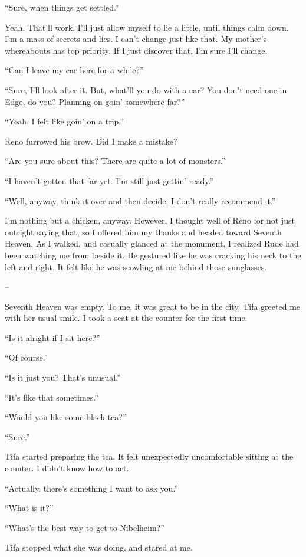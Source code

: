 \documentclass[oneside]{book}
\begin{document}
“Sure, when things get settled.”

Yeah. That’ll work. I’ll just allow myself to lie a little, until things calm down. I’m a mass of secrets and lies. I can’t change just like that. My mother’s whereabouts has top priority. If I just discover that, I’m sure I’ll change.

“Can I leave my car here for a while?”

“Sure, I’ll look after it. But, what’ll you do with a car? You don’t need one in Edge, do you? Planning on goin’ somewhere far?”

“Yeah. I felt like goin’ on a trip.”

Reno furrowed his brow. Did I make a mistake?

“Are you sure about this? There are quite a lot of monsters.”

“I haven’t gotten that far yet. I’m still just gettin’ ready.”

“Well, anyway, think it over and then decide. I don’t really recommend it.”

I’m nothing but a chicken, anyway. However, I thought well of Reno for not just outright saying that, so I offered him my thanks and headed toward Seventh Heaven. As I walked, and casually glanced at the monument, I realized Rude had been watching me from beside it. He gestured like he was cracking his neck to the left and right. It felt like he was scowling at me behind those sunglasses.

–

Seventh Heaven was empty. To me, it was great to be in the city. Tifa greeted me with her usual smile. I took a seat at the counter for the first time.

“Is it alright if I sit here?”

“Of course.”

“Is it just you? That’s unusual.”

“It’s like that sometimes.”

“Would you like some black tea?”

“Sure.”

Tifa started preparing the tea. It felt unexpectedly uncomfortable sitting at the counter. I didn’t know how to act.

“Actually, there’s something I want to ask you.”

“What is it?”

“What’s the best way to get to Nibelheim?”

Tifa stopped what she was doing, and stared at me.
\end{document}
